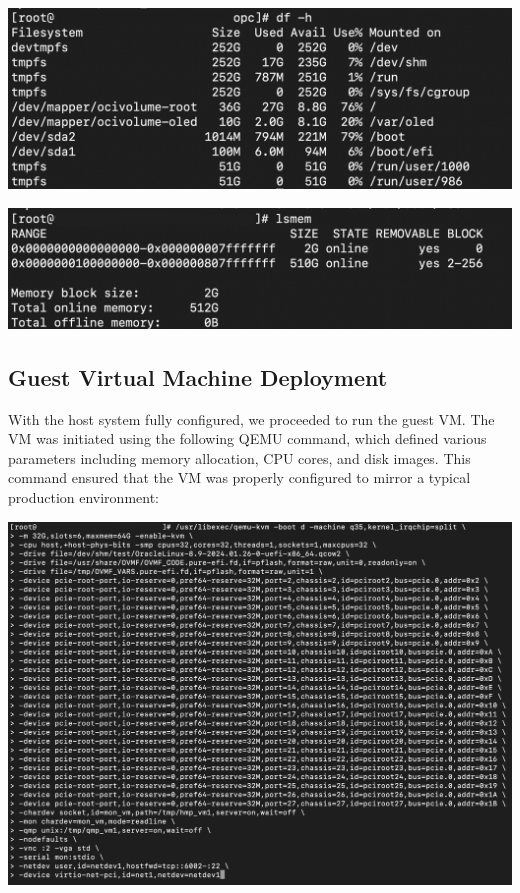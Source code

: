 \begin{center}
    \centering
    \includegraphics[width=\textwidth]{Images/Storage on the Host.png}
    \label{fig:casa}
\end{center}

\begin{center}
    \centering
    \includegraphics[width=\textwidth]{Images/Memory on the Host.png}
    \label{fig:casa}
\end{center}

\subsection{Guest Virtual Machine Deployment}
With the host system fully configured, we proceeded to run the guest VM. The VM was initiated using the following QEMU command, which defined various parameters including memory allocation, CPU cores, and disk images. This command ensured that the VM was properly configured to mirror a typical production environment:

\begin{center}
    \centering
    \includegraphics[width=\textwidth]{Images/Launching the Guest.png}
    \label{fig:casa}
\end{center}

